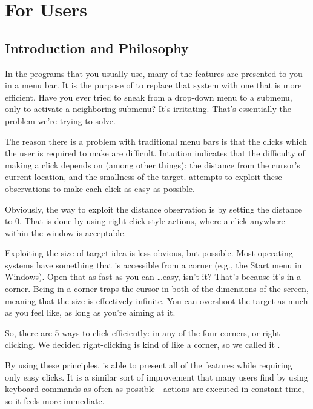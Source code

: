 \chapter{For Users}


\section{Introduction and Philosophy}

In the programs that you usually use, many of the features are presented to
you in a menu bar.  It is the purpose of \fc{} to replace that system with one
that is more efficient.  Have you ever tried to sneak from a drop-down menu to
a submenu, only to activate a neighboring submenu?  It's irritating.  That's
essentially the problem we're trying to solve.

The reason there is a problem with traditional menu bars is that the clicks
which the user is required to make are difficult.  Intuition indicates that
the difficulty of making a click depends on (among other things): the distance
from the cursor's current location, and the smallness of the target.  \fc{}
attempts to exploit these observations to make each click as easy as possible.

Obviously, the way to exploit the distance observation is by setting the
distance to 0.  That is done by using right-click style actions, where a click
anywhere within the window is acceptable.

Exploiting the size-of-target idea is less obvious, but possible.  Most
operating systems have something that is accessible from a corner (e.g., the
Start menu in Windows).  Open that as fast as you can \ldots easy, isn't it?
That's because it's in a corner.  Being in a corner traps the cursor in both
of the dimensions of the screen, meaning that the size is effectively
infinite.  You can overshoot the target as much as you feel like, as long as
you're aiming at it.

So, there are 5 ways to click efficiently: in any of the four corners, or
right-clicking.  We decided right-clicking is kind of like a corner, so we
called it \fc.

By using these principles, \fc{} is able to present all of the features while
requiring only easy clicks.  It is a similar sort of improvement that many
users find by using keyboard commands as often as possible---actions are
executed in constant time, so it feels more immediate.

